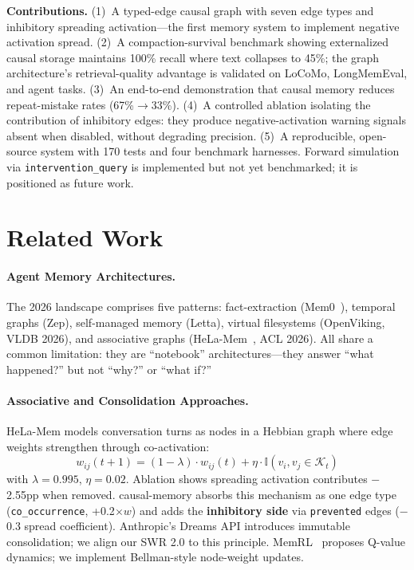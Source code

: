 \documentclass[letterpaper,twocolumn,10pt]{article}
\begin{document}
\textbf{Contributions.} (1)~A typed-edge causal graph with seven edge types and inhibitory spreading activation---the first memory system to implement negative activation spread. (2)~A compaction-survival benchmark showing externalized causal storage maintains 100\% recall where text collapses to 45\%; the graph architecture's retrieval-quality advantage is validated on LoCoMo, LongMemEval, and agent tasks. (3)~An end-to-end demonstration that causal memory reduces repeat-mistake rates (67\%$\rightarrow$33\%). (4)~A controlled ablation isolating the contribution of inhibitory edges: they produce negative-activation warning signals absent when disabled, without degrading precision. (5)~A reproducible, open-source system with 170 tests and four benchmark harnesses. Forward simulation via \texttt{intervention\_query} is implemented but not yet benchmarked; it is positioned as future work.

\section{Related Work}
\label{sec:related}

\paragraph{Agent Memory Architectures.}
The 2026 landscape comprises five patterns: fact-extraction (Mem0~\cite{mem0}), temporal graphs (Zep), self-managed memory (Letta), virtual filesystems (OpenViking, VLDB 2026), and associative graphs (HeLa-Mem~\cite{helamem}, ACL 2026). All share a common limitation: they are ``notebook'' architectures---they answer ``what happened?'' but not ``why?'' or ``what if?''

\paragraph{Associative and Consolidation Approaches.}
HeLa-Mem models conversation turns as nodes in a Hebbian graph where edge weights strengthen through co-activation:
\begin{equation}
w_{ij}(t\!+\!1) = (1-\lambda)\cdot w_{ij}(t) + \eta\cdot\mathbb{I}(v_i, v_j \in \mathcal{K}_t)
\label{eq:hebbian}
\end{equation}
with $\lambda\!=\!0.995$, $\eta\!=\!0.02$. Ablation shows spreading activation contributes $-$2.55pp when removed. causal-memory absorbs this mechanism as one edge type (\texttt{co\_occurrence}, +0.2$\times w$) and adds the \textbf{inhibitory side} via \texttt{prevented} edges ($-$0.3 spread coefficient). Anthropic's Dreams API introduces immutable consolidation; we align our SWR 2.0 to this principle. MemRL~\cite{memrl} proposes Q-value dynamics; we implement Bellman-style node-weight updates.
\end{document}
